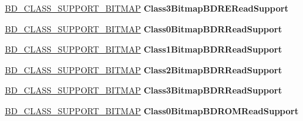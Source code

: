 \begin{DoxyCompactItemize}
\mbox{\label{struct___f_e_a_t_u_r_e___b_d___r_e_a_d_a305fa99f268616f7ebc8af5861c7aebb}} 
\hyperlink{struct___b_d___c_l_a_s_s___s_u_p_p_o_r_t___b_i_t_m_a_p}{B\+D\+\_\+\+C\+L\+A\+S\+S\+\_\+\+S\+U\+P\+P\+O\+R\+T\+\_\+\+B\+I\+T\+M\+AP} {\bfseries Class3\+Bitmap\+B\+D\+R\+E\+Read\+Support}
\item 
\mbox{\label{struct___f_e_a_t_u_r_e___b_d___r_e_a_d_ad295f3dd9feb64e011c629adeb82400a}} 
\hyperlink{struct___b_d___c_l_a_s_s___s_u_p_p_o_r_t___b_i_t_m_a_p}{B\+D\+\_\+\+C\+L\+A\+S\+S\+\_\+\+S\+U\+P\+P\+O\+R\+T\+\_\+\+B\+I\+T\+M\+AP} {\bfseries Class0\+Bitmap\+B\+D\+R\+Read\+Support}
\item 
\mbox{\label{struct___f_e_a_t_u_r_e___b_d___r_e_a_d_a0cd2d7870532cd4bfc6a9f9ea48313f2}} 
\hyperlink{struct___b_d___c_l_a_s_s___s_u_p_p_o_r_t___b_i_t_m_a_p}{B\+D\+\_\+\+C\+L\+A\+S\+S\+\_\+\+S\+U\+P\+P\+O\+R\+T\+\_\+\+B\+I\+T\+M\+AP} {\bfseries Class1\+Bitmap\+B\+D\+R\+Read\+Support}
\item 
\mbox{\label{struct___f_e_a_t_u_r_e___b_d___r_e_a_d_aa65e4b82e119a376579eb1c1508d6ba0}} 
\hyperlink{struct___b_d___c_l_a_s_s___s_u_p_p_o_r_t___b_i_t_m_a_p}{B\+D\+\_\+\+C\+L\+A\+S\+S\+\_\+\+S\+U\+P\+P\+O\+R\+T\+\_\+\+B\+I\+T\+M\+AP} {\bfseries Class2\+Bitmap\+B\+D\+R\+Read\+Support}
\item 
\mbox{\label{struct___f_e_a_t_u_r_e___b_d___r_e_a_d_a70f0ff340c54af1dbbfa5a6cd5582ab8}} 
\hyperlink{struct___b_d___c_l_a_s_s___s_u_p_p_o_r_t___b_i_t_m_a_p}{B\+D\+\_\+\+C\+L\+A\+S\+S\+\_\+\+S\+U\+P\+P\+O\+R\+T\+\_\+\+B\+I\+T\+M\+AP} {\bfseries Class3\+Bitmap\+B\+D\+R\+Read\+Support}
\item 
\mbox{\label{struct___f_e_a_t_u_r_e___b_d___r_e_a_d_a1236819a1ea4f69091ccfc8ea72e441c}} 
\hyperlink{struct___b_d___c_l_a_s_s___s_u_p_p_o_r_t___b_i_t_m_a_p}{B\+D\+\_\+\+C\+L\+A\+S\+S\+\_\+\+S\+U\+P\+P\+O\+R\+T\+\_\+\+B\+I\+T\+M\+AP} {\bfseries Class0\+Bitmap\+B\+D\+R\+O\+M\+Read\+Support}
\item 
\mbox{\label{struct___f_e_a_t_u_r_e___b_d___r_e_a_d_a860363aefb513c98d128d61e433dcc15}} 

\end{DoxyCompactItemize}
